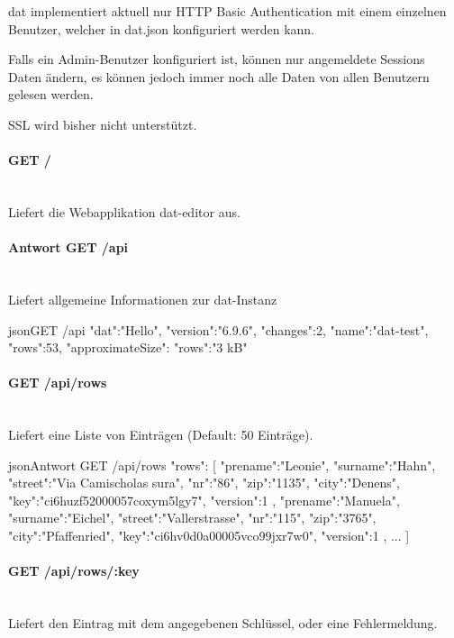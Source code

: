 dat implementiert aktuell nur HTTP Basic Authentication mit einem einzelnen Benutzer, welcher in dat.json konfiguriert werden kann. 

Falls ein Admin-Benutzer konfiguriert ist, können nur angemeldete Sessions Daten ändern, es können jedoch immer noch alle Daten von allen Benutzern gelesen werden.

SSL wird bisher nicht unterstützt.

\paragraph{GET /} ~\\
Liefert die Webapplikation dat-editor aus.

\paragraph{Antwort GET /api} ~\\
Liefert allgemeine Informationen zur dat-Instanz
\begin{srclst}{json}{GET /api}
    {
        "dat":"Hello",
        "version":"6.9.6",
        "changes":2,
        "name":"dat-test",
        "rows":53,
        "approximateSize":{
            "rows":"3 kB"
        }
    }
\end{srclst}

\paragraph{GET /api/rows} ~\\
Liefert eine Liste von Einträgen (Default: 50 Einträge).
\begin{srclst}{json}{Antwort GET /api/rows}
{
    "rows": [
        {
            "prename":"Leonie", "surname":"Hahn", 
            "street":"Via Camischolas sura", "nr":"86", 
            "zip":"1135", "city":"Denens", 
            "key":"ci6huzf52000057coxym5lgy7", "version":1
        },
        {
            "prename":"Manuela", "surname":"Eichel", 
            "street":"Vallerstrasse", "nr":"115",
            "zip":"3765", "city":"Pfaffenried", 
            "key":"ci6hv0d0a00005vco99jxr7w0", "version":1
        },
        ...
    ]
}
\end{srclst}

\paragraph{GET /api/rows/:key} ~\\
Liefert den Eintrag mit dem angegebenen Schlüssel, oder eine Fehlermeldung.


